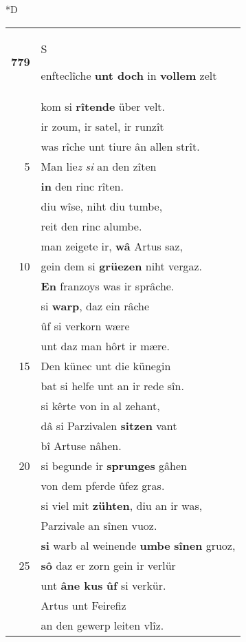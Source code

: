 \documentclass[8pt,a4paper,notitlepage]{article}
\begin{document}
\begin{table}[ht]
\begin{minipage}[t]{0.5\linewidth}
\small
\begin{center}*D
\end{center}
\begin{tabular}{rl}
\textbf{779} & \begin{large}S\end{large}enfteclîche \textbf{unt doch} in \textbf{vollem} zelt\\ 
 & kom si \textbf{rîtende} über velt.\\ 
 & ir zoum, ir satel, ir runzît\\ 
 & was rîche unt tiure ân allen strît.\\ 
5 & Man lie\textit{z} \textit{si} an den zîten\\ 
 & \textbf{in} den rinc rîten.\\ 
 & diu wîse, niht diu tumbe,\\ 
 & reit den rinc alumbe.\\ 
 & man zeigete ir, \textbf{wâ} Artus saz,\\ 
10 & gein dem si \textbf{grüezen} niht vergaz.\\ 
 & \textbf{En} franzoys was ir sprâche.\\ 
 & si \textbf{warp}, daz ein râche\\ 
 & ûf si verkorn wære\\ 
 & unt daz man hôrt ir mære.\\ 
15 & Den künec unt die künegin\\ 
 & bat si helfe unt an ir rede sîn.\\ 
 & si kêrte von in al zehant,\\ 
 & dâ si Parzivalen \textbf{sitzen} vant\\ 
 & bî Artuse nâhen.\\ 
20 & si begunde ir \textbf{sprunges} gâhen\\ 
 & von dem pferde ûfez gras.\\ 
 & si viel mit \textbf{zühten}, diu an ir was,\\ 
 & Parzivale an sînen vuoz.\\ 
 & \textbf{si} warb al weinende \textbf{umbe} \textbf{sînen} gruoz,\\ 
25 & \textbf{sô} daz er zorn gein ir verlür\\ 
 & unt \textbf{âne kus} \textbf{ûf} si verkür.\\ 
 & Artus unt Feirefiz\\ 
 & an den gewerp leiten vlîz.\\ 

\end{tabular}
\end{minipage}
\end{table}
\end{document}
